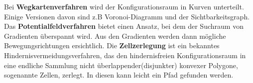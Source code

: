 Bei \textbf{Wegkartenverfahren} wird der Konfigurationsraum in Kurven unterteilt. Einige Versionen davon sind z.B Voronoi-Diagramm\cite{voronoi} und der Sichtbarkeitsgraph\cite{visG1}. Das \textbf{Potentialfeldverfahren} bietet einen Ansatz, bei dem der Suchraum von Gradienten überspannt wird. Aus den Gradienten werden dann mögliche Bewegungsrichtungen ersichtlich. Die \textbf{Zellzerlegung}\cite{cd} ist ein bekanntes Hindernisvermeidungsverfahren, das den hindernisfreien Konfigurationsraum in eine endliche Sammlung nicht überlappender(disjunkter) konvexer Polygone, sogenannte Zellen, zerlegt. In diesen kann leicht ein Pfad gefunden werden.
